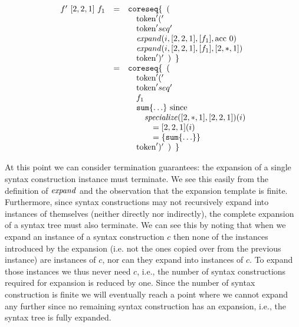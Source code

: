 \documentclass{kththesis}
\begin{document}
$$
\begin{array}{rcl}
f'~[2, 2, 1]~f_1 & = & \text{\texttt{coreseq}}\{ \enspace \text{(} \\
& & \quad \text{token}'(' \\
& & \quad \text{token}'seq' \\
& & \quad \mathit{expand}(i, [2, 2, 1], [f_1], \text{acc}~0) \\
& & \quad \mathit{expand}(i, [2, 2, 1], [f_1], [2, *, 1]) \\
& & \quad \text{token}')' \enspace \text{)} \enspace \} \\
& = & \text{\texttt{coreseq}}\{ \enspace \text{(} \\
& & \quad \text{token}'(' \\
& & \quad \text{token}'seq' \\
& & \quad f_1 \\
& & \quad \text{\texttt{sum}}\{\ldots\} \text{ since} \\
& & \qquad \mathit{specialize}([2, *, 1], [2, 2, 1])(i) \\
& & \qquad \quad = [2, 2, 1](i) \\
& & \qquad \quad = \{\text{\texttt{sum}}\{\ldots\}\} \\
& & \quad \text{token}')' \enspace \text{)} \enspace \} \\
\end{array}
$$

At this point we can consider termination guarantees: the expansion of a single syntax construction instance must terminate. We see this easily from the definition of $\mathit{expand}$ and the observation that the expansion template is finite. Furthermore, since syntax constructions may not recursively expand into instances of themselves (neither directly nor indirectly), the complete expansion of a syntax tree must also terminate. We can see this by noting that when we expand an instance of a syntax construction $c$ then none of the instances introduced by the expansion (i.e. not the ones copied over from the previous instance) are instances of $c$, nor can they expand into instances of $c$. To expand those instances we thus never need $c$, i.e., the number of syntax constructions required for expansion is reduced by one. Since the number of syntax construction is finite we will eventually reach a point where we cannot expand any further since no remaining syntax construction has an expansion, i.e., the syntax tree is fully expanded.
\end{document}
